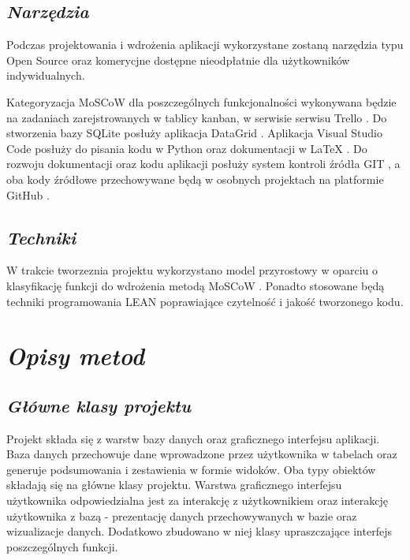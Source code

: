 \documentclass[a4paper,10pt, twoside]{report}
\newcommand{\customstylechapter}[1]{\large{\textit{#1}}}
\newcommand{\customstylesection}[1]{\textbf{\textit{#1}}}
\begin{document}
\section{\customstylesection{Narzędzia}}
{Podczas projektowania i wdrożenia aplikacji wykorzystane zostaną narzędzia typu
 Open Source oraz komerycjne dostępne nieodpłatnie dla użytkowników 
indywidualnych.}

{Kategoryzacja MoSCoW \cite{MOSCOW} dla poszczególnych funkcjonalności 
wykonywana będzie na zadaniach zarejstrowanych w tablicy kanban, w serwisie 
serwisu Trello \cite{Trello}. Do stworzenia bazy SQLite \cite{SQLite} posłuży 
aplikacja DataGrid \cite{DataGrid}. Aplikacja Visual Studio Code 
\cite{VSCode} posłuży do pisania kodu w Python \cite{Python} oraz dokumentacji 
w LaTeX \cite{LaTeX}. Do rozwoju dokumentacji oraz kodu aplikacji posłuży 
system kontroli źródła GIT \cite{GIT}, a oba kody źródłowe przechowywane będą w 
osobnych projektach na platformie GitHub \cite{GitHub}.}

\section{\customstylesection{Techniki}}
{W trakcie tworzeznia projektu wykorzystano model przyrostowy 
\cite{Model Przyrostowy} w oparciu o klasyfikację funkcji do wdrożenia metodą 
MoSCoW \cite{MOSCOW}. Ponadto stosowane będą techniki programowania LEAN 
\cite{LEAN} poprawiające czytelność i jakość tworzonego kodu.}

\chapter{\customstylechapter{Opisy metod}} \label{Opisy metod}
\section{\customstylesection{Główne klasy projektu}}
{Projekt składa się z warstw bazy danych oraz graficznego interfejsu aplikacji. 
Baza danych przechowuje dane wprowadzone przez użytkownika w tabelach oraz 
generuje podsumowania i zestawienia w formie widoków. Oba typy obiektów składają
 się na główne klasy projektu. Warstwa graficznego interfejsu użytkownika 
odpowiedzialna jest za interakcję z użytkownikiem oraz interakcję użytkownika z 
bazą - prezentację danych przechowywanych w bazie oraz wizualizacje danych. 
Dodatkowo zbudowano w niej klasy upraszczające interfejs poszczególnych funkcji.}
\end{document}
